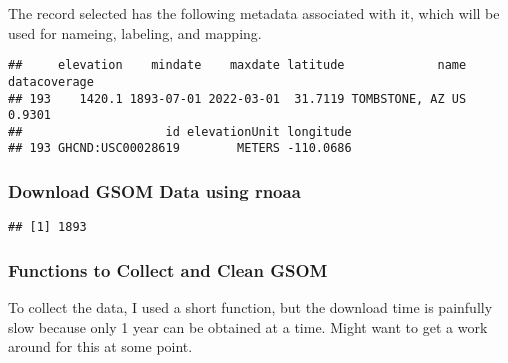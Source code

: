 \documentclass{article}
\begin{document}
The record selected has the following metadata associated with it, which will be used for nameing, labeling, and mapping. 

\begin{knitrout}
\color{fgcolor}\begin{kframe}
\begin{verbatim}
##     elevation    mindate    maxdate latitude             name datacoverage
## 193    1420.1 1893-07-01 2022-03-01  31.7119 TOMBSTONE, AZ US       0.9301
##                    id elevationUnit longitude
## 193 GHCND:USC00028619        METERS -110.0686
\end{verbatim}
\end{kframe}
\end{knitrout}

\subsubsection{Download GSOM Data using rnoaa}

\begin{knitrout}
\color{fgcolor}\begin{kframe}
\begin{verbatim}
## [1] 1893
\end{verbatim}
\end{kframe}
\end{knitrout}

\subsubsection{Functions to Collect and Clean GSOM}

To collect the data, I used a short function, but the download time is painfully slow because only 1 year can be obtained at a time. Might want to get a work around for this at some point. 
\end{document}
